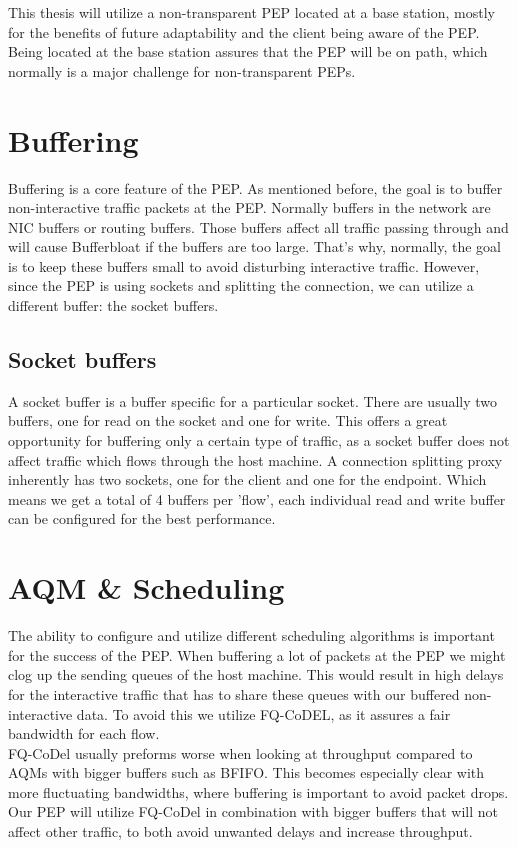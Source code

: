 \documentclass[a4paper,english, 11pt]{report}
\begin{document}
This thesis will utilize a non-transparent PEP located at a base station, mostly for the benefits of future adaptability and the client being aware of the PEP. Being located at the base station assures that the PEP will be on path, which normally is a major challenge for non-transparent PEPs.

\section{Buffering}
Buffering is a core feature of the PEP. As mentioned before, the goal is to buffer non-interactive traffic packets at the PEP. Normally buffers in the network are NIC buffers or routing buffers. Those buffers affect all traffic passing through and will cause Bufferbloat if the buffers are too large. That's why, normally, the goal is to keep these buffers small to avoid disturbing interactive traffic. However, since the PEP is using sockets and splitting the connection, we can utilize a different buffer: the socket buffers.

\subsection{Socket buffers}
A socket buffer is a buffer specific for a particular socket. There are usually two buffers, one for read on the socket and one for write. This offers a great opportunity for buffering only a certain type of traffic, as a socket buffer does not affect traffic which flows through the host machine. A connection splitting proxy inherently has two sockets, one for the client and one for the endpoint. Which means we get a total of 4 buffers per 'flow', each individual read and write buffer can be configured for the best performance.

\section{AQM \& Scheduling}
The ability to configure and utilize different scheduling algorithms is important for the success of the  PEP. When buffering a lot of packets at the PEP we might clog up the sending queues of the host machine. This would result in high delays for the interactive traffic that has to share these queues with our buffered non-interactive data. To avoid this we utilize FQ-CoDEL, as it assures a fair bandwidth for each flow.\\

FQ-CoDel usually preforms worse when looking at throughput compared to AQMs with bigger buffers such as BFIFO. This becomes especially clear with more fluctuating bandwidths, where buffering is important to avoid packet drops. Our PEP will utilize FQ-CoDel in combination with bigger buffers that will not affect other traffic, to both avoid unwanted delays and increase throughput.\\
\end{document}
